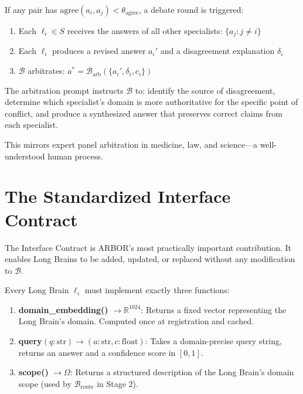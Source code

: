 \documentclass[12pt]{article}
\begin{document}
If any pair has $\text{agree}(a_i, a_j) < \theta_{\text{agree}}$, a debate round is triggered:

\begin{enumerate}
    \item Each $\ell_i \in S$ receives the answers of all other specialists: $\{a_j : j \neq i\}$
    \item Each $\ell_i$ produces a revised answer $a_i'$ and a disagreement explanation $\delta_i$
    \item $\mathcal{B}$ arbitrates: $a^* = \mathcal{B}_{\text{arb}}(\{a_i', \delta_i, c_i\})$
\end{enumerate}

The arbitration prompt instructs $\mathcal{B}$ to: identify the source of disagreement, determine which specialist's domain is more authoritative for the specific point of conflict, and produce a synthesized answer that preserves correct claims from each specialist.

This mirrors expert panel arbitration in medicine, law, and science---a well-understood human process.

\section{The Standardized Interface Contract}
\label{sec:interface}

The Interface Contract is ARBOR's most practically important contribution. It enables Long Brains to be added, updated, or replaced without any modification to $\mathcal{B}$.

Every Long Brain $\ell_i$ must implement exactly three functions:

\begin{enumerate}
    \item \textbf{domain\_embedding()} $\rightarrow \mathbb{R}^{1024}$: Returns a fixed vector representing the Long Brain's domain. Computed once at registration and cached.

    \item \textbf{query}$(q: \text{str}) \rightarrow (a: \text{str}, c: \text{float})$: Takes a domain-precise query string, returns an answer and a confidence score in $[0,1]$.

    \item \textbf{scope()} $\rightarrow \Omega$: Returns a structured description of the Long Brain's domain scope (used by $\mathcal{B}_{\text{route}}$ in Stage 2).
\end{enumerate}
\end{document}
